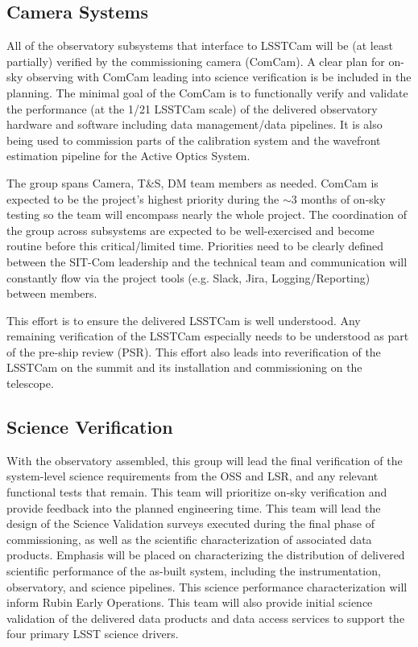 \documentclass[SE,lsstdraft,authoryear,toc]{lsstdoc}
\begin{document}
\subsection{Camera Systems}
All of the observatory subsystems that interface to LSSTCam will be (at least partially) verified by the commissioning camera (ComCam).
A clear plan for on-sky observing with ComCam leading into science verification is be included in the planning.
The minimal goal of the ComCam is to functionally verify and validate the performance (at the 1/21 LSSTCam scale) of the delivered observatory hardware and software including data management/data pipelines.
It is also being used to commission parts of the calibration system and the wavefront estimation pipeline for the Active Optics System.

The group spans Camera, T\&S, DM team members as needed.
ComCam is expected to be the project's highest priority during the $\sim$3 months of on-sky testing so the team will encompass nearly the whole project.
The coordination of the group across subsystems are expected to be well-exercised and become routine before this critical/limited time.
Priorities need to be clearly defined between the SIT-Com leadership and the technical team and communication will constantly flow via the project tools (e.g. Slack, Jira, Logging/Reporting) between members.

This effort is to ensure the delivered LSSTCam is well understood.
Any remaining verification of the LSSTCam especially needs to be understood as part of the pre-ship review (PSR).
This effort also leads into reverification of the LSSTCam on the summit and its installation and commissioning on the telescope.


\subsection{Science Verification}
With the observatory assembled, this group will lead the final verification of the system-level science requirements from the OSS and LSR, and any relevant functional tests that remain.
This team will prioritize on-sky verification and provide feedback into the planned engineering time.
This team will lead the design of the Science Validation surveys executed during the final phase of commissioning, as well as the scientific characterization of associated data products.
Emphasis will be placed on characterizing the distribution of delivered scientific performance of the as-built system, including the instrumentation, observatory, and science pipelines.
This science performance characterization will inform Rubin Early Operations.
This team will also provide initial science validation of the delivered data products and data access services to support the four primary LSST science drivers.
\end{document}
